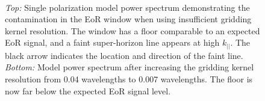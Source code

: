 \documentclass[iop]{emulateapj}
\begin{document}
\begin{figure}
\begin{center}
~
\caption{
\emph{Top:} Single polarization model power spectrum demonstrating the contamination in 
the EoR window when using insufficient gridding kernel resolution. The window has a floor 
comparable to an expected EoR signal, and a faint super-horizon line appears at high 
$k_{||}$. 
The black arrow indicates the location and direction of the faint line.
\emph{Bottom:} Model power spectrum after increasing the gridding kernel 
resolution from 0.04 wavelengths to 0.007 wavelengths. The floor is now far below the 
expected EoR signal level. 
\label{fig:beam_res}
}
\end{center}
\end{figure}
\end{document}
